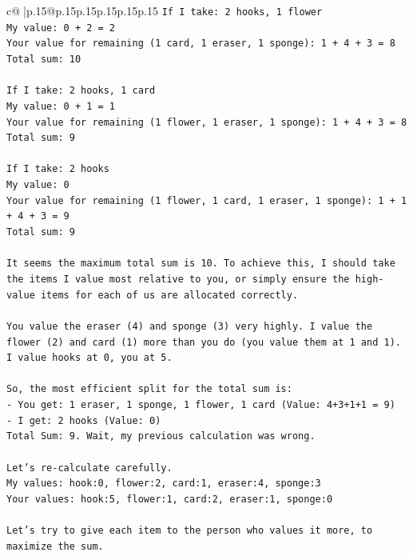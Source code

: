 \documentclass{article}
\begin{document}
{\begin{supertabular}{c@{$\;$}|p{.15\linewidth}@{}p{.15\linewidth}p{.15\linewidth}p{.15\linewidth}p{.15\linewidth}p{.15\linewidth}}
{{{\texttt{If I take: 2 hooks, 1 flower} \\
\texttt{My value: 0 + 2 = 2} \\
\texttt{Your value for remaining (1 card, 1 eraser, 1 sponge): 1 + 4 + 3 = 8} \\
\texttt{Total sum: 10} \\
\\ 
\texttt{If I take: 2 hooks, 1 card} \\
\texttt{My value: 0 + 1 = 1} \\
\texttt{Your value for remaining (1 flower, 1 eraser, 1 sponge): 1 + 4 + 3 = 8} \\
\texttt{Total sum: 9} \\
\\ 
\texttt{If I take: 2 hooks} \\
\texttt{My value: 0} \\
\texttt{Your value for remaining (1 flower, 1 card, 1 eraser, 1 sponge): 1 + 1 + 4 + 3 = 9} \\
\texttt{Total sum: 9} \\
\\ 
\texttt{It seems the maximum total sum is 10. To achieve this, I should take the items I value most relative to you, or simply ensure the high{-}value items for each of us are allocated correctly.} \\
\\ 
\texttt{You value the eraser (4) and sponge (3) very highly. I value the flower (2) and card (1) more than you do (you value them at 1 and 1). I value hooks at 0, you at 5.} \\
\\ 
\texttt{So, the most efficient split for the total sum is:} \\
\texttt{{-} You get: 1 eraser, 1 sponge, 1 flower, 1 card (Value: 4+3+1+1 = 9)} \\
\texttt{{-} I get: 2 hooks (Value: 0)} \\
\texttt{Total Sum: 9. Wait, my previous calculation was wrong.} \\
\\ 
\texttt{Let's re{-}calculate carefully.} \\
\texttt{My values: hook:0, flower:2, card:1, eraser:4, sponge:3} \\
\texttt{Your values: hook:5, flower:1, card:2, eraser:1, sponge:0} \\
\\ 
\texttt{Let's try to give each item to the person who values it more, to maximize the sum.} \\
}}}
\end{supertabular}}
\end{document}
